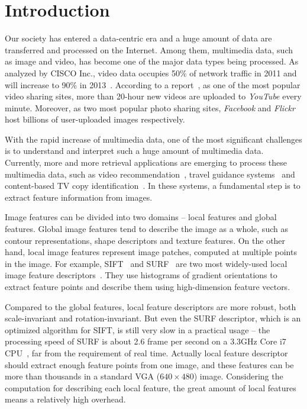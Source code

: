 \section{Introduction}

Our society has entered a data-centric era and a huge amount of data are transferred and processed on the Internet. Among them, multimedia data, such as image and video, has become one of the major data types being processed. As analyzed by CISCO Inc., video data occupies 50\% of network traffic in 2011 and will increase to 90\% in 2013~\cite{CISCO2011}.  According to a report~\cite{youtube2009}, as one of the most popular video sharing sites, more than 20-hour new videos are uploaded to \emph{YouTube} every minute. Moreover, as two most popular photo sharing sites, \emph{Facebook} and \emph{Flickr} host billions of user-uploaded images respectively.

With the rapid increase of multimedia data, one of the most significant challenges is to understand and interpret such a huge amount of multimedia data. Currently, more and more retrieval applications are emerging to process these multimedia data, such as video recommendation~\cite{videorecommendation2007}, travel guidance systems~\cite{travelguidance2010} and content-based TV copy identification~\cite{tvidentify2003}. In these systems, a fundamental step is to extract feature information from images. 

Image features can be divided into two domains -- local features and global features. Global image features tend to describe the image as a whole, such as contour representations, shape descriptors and texture features. On the other hand, local image features represent image patches, computed at multiple points in the image. For example, SIFT~\cite{Lowe2004SIFT} and SURF~\cite{Bay2006SURF} are two most widely-used local image feature descriptors~\cite{Mikolajczyk2005Evaluation}\cite{Bauer2007Evaluation}. They use histograms of gradient orientations to extract feature points and describe them using high-dimension feature vectors.

Compared to the global features, local feature descriptors are more robust, both scale-invariant and rotation-invariant. But even the SURF descriptor, which is an optimized algorithm for SIFT, is still very slow in a practical usage -- the processing speed of SURF is about 2.6 frame per second on a 3.3GHz Core i7 CPU~\cite{Fang2011ispass}, far from the requirement of real time. Actually local feature descriptor should extract enough feature points from one image, and these features can be more than thousands in a standard VGA ($640\times480$) image. Considering the computation for describing each local feature, the great amount of local features means a relatively high overhead.

